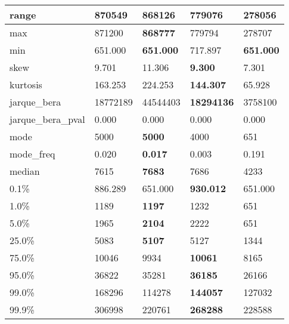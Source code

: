 \begin{table}[H]
\begin{tabular}{|l|m{10em}|m{10em}|m{10em}|m{10em}|}
\hline range & 870549 & \bfseries 868126 & 779076 & \cellcolor[rgb]{0.9, 0.54, 0.52} 278056 \\
\hline max & 871200 & \bfseries 868777 & 779794 & \cellcolor[rgb]{0.9, 0.54, 0.52} 278707 \\
\hline min & 651.000 & \bfseries 651.000 & \cellcolor[rgb]{0.9, 0.54, 0.52} 717.897 & \bfseries 651.000 \\
\hline skew & 9.701 & 11.306 & \bfseries 9.300 & \cellcolor[rgb]{0.9, 0.54, 0.52} 7.301 \\
\hline kurtosis & 163.253 & 224.253 & \bfseries 144.307 & \cellcolor[rgb]{0.9, 0.54, 0.52} 65.928 \\
\hline jarque\_bera & 18772189 & \cellcolor[rgb]{0.9, 0.54, 0.52} 44544403 & \bfseries 18294136 & 3758100 \\
\hline jarque\_bera\_pval & 0.000 & 0.000 & 0.000 & 0.000 \\
\hline mode & 5000 & \bfseries 5000 & 4000 & \cellcolor[rgb]{0.9, 0.54, 0.52} 651 \\
\hline mode\_freq & 0.020 & \bfseries 0.017 & 0.003 & \cellcolor[rgb]{0.9, 0.54, 0.52} 0.191 \\
\hline median & 7615 & \bfseries 7683 & 7686 & \cellcolor[rgb]{0.9, 0.54, 0.52} 4233 \\
\hline 0.1\% & 886.289 & \cellcolor[rgb]{0.9, 0.54, 0.52} 651.000 & \bfseries 930.012 & \cellcolor[rgb]{0.9, 0.54, 0.52} 651.000 \\
\hline 1.0\% & 1189 & \bfseries 1197 & 1232 & \cellcolor[rgb]{0.9, 0.54, 0.52} 651 \\
\hline 5.0\% & 1965 & \bfseries 2104 & 2222 & \cellcolor[rgb]{0.9, 0.54, 0.52} 651 \\
\hline 25.0\% & 5083 & \bfseries 5107 & 5127 & \cellcolor[rgb]{0.9, 0.54, 0.52} 1344 \\
\hline 75.0\% & 10046 & 9934 & \bfseries 10061 & \cellcolor[rgb]{0.9, 0.54, 0.52} 8165 \\
\hline 95.0\% & 36822 & 35281 & \bfseries 36185 & \cellcolor[rgb]{0.9, 0.54, 0.52} 26166 \\
\hline 99.0\% & 168296 & \cellcolor[rgb]{0.9, 0.54, 0.52} 114278 & \bfseries 144057 & 127032 \\
\hline 99.9\% & 306998 & \cellcolor[rgb]{0.9, 0.54, 0.52} 220761 & \bfseries 268288 & 228588 \\
\hline
\end{tabular}
\end{table}
